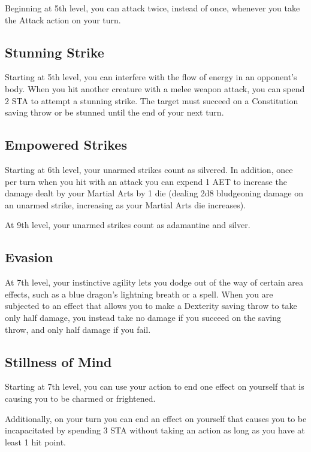 Beginning at 5th level, you can attack twice, instead of once, whenever you take the Attack action on your turn.

\subsection{Stunning Strike}

Starting at 5th level, you can interfere with the flow of energy in an opponent's body. When you hit another creature with a melee weapon attack, you can spend 2 STA to attempt a stunning strike. The target must succeed on a Constitution saving throw or be stunned until the end of your next turn.

\subsection{Empowered Strikes}

Starting at 6th level, your unarmed strikes count as silvered. In addition, once per turn when you hit with an attack you can expend 1 AET to increase the damage dealt by your Martial Arts by 1 die (dealing 2d8 bludgeoning damage on an unarmed strike, increasing as your Martial Arts die increases).

At 9th level, your unarmed strikes count as adamantine and silver.

\subsection{Evasion}

At 7th level, your instinctive agility lets you dodge out of the way of certain area effects, such as a blue dragon's lightning breath or a  spell. When you are subjected to an effect that allows you to make a Dexterity saving throw to take only half damage, you instead take no damage if you succeed on the saving throw, and only half damage if you fail.

\subsection{Stillness of Mind}

Starting at 7th level, you can use your action to end one effect on yourself that is causing you to be charmed or frightened.

Additionally, on your turn you can end an effect on yourself that causes you to be incapacitated by spending 3 STA without taking an action as long as you have at least 1 hit point.


